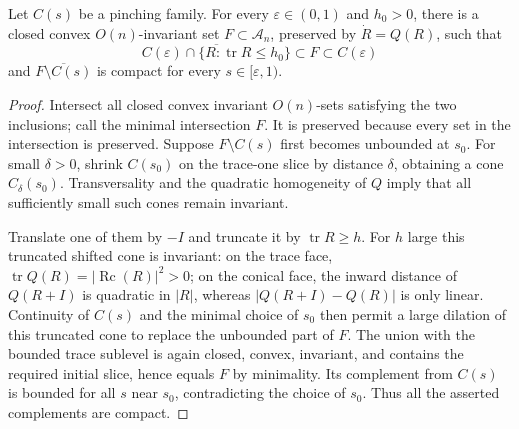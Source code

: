 \begin{theorem}
  \label{thm:chow-ii-generalized-pinching-set}
  Let \(C(s)\) be a pinching family.  For every \(\varepsilon\in(0,1)\) and
  \(h_0>0\), there is a closed convex \(O(n)\)-invariant set
  \(F\subset\mathcal A_n\), preserved by \(\dot R=Q(R)\), such that
  \[
  \overline{C(\varepsilon)\cap\{R:\operatorname{tr}R\le h_0\}}
  \subset F\subset C(\varepsilon)
  \]
  and \(\overline{F\setminus C(s)}\) is compact for every
  \(s\in[\varepsilon,1)\).
\end{theorem}
\begin{proof}
  Intersect all closed convex invariant \(O(n)\)-sets satisfying the two
  inclusions; call the minimal intersection \(F\).  It is preserved because
  every set in the intersection is preserved.  Suppose
  \(F\setminus C(s)\) first becomes unbounded at \(s_0\).  For small
  \(\delta>0\), shrink \(C(s_0)\) on the trace-one slice by distance
  \(\delta\), obtaining a cone \(C_\delta(s_0)\).  Transversality and the
  quadratic homogeneity of \(Q\) imply that all sufficiently small such
  cones remain invariant.

  Translate one of them by \(-I\) and truncate it by
  \(\operatorname{tr}R\ge h\).  For \(h\) large this truncated shifted cone is
  invariant: on the trace face,
  \(\operatorname{tr}Q(R)=|\operatorname{Rc}(R)|^2>0\); on the conical face,
  the inward distance of \(Q(R+I)\) is quadratic in \(|R|\), whereas
  \(|Q(R+I)-Q(R)|\) is only linear.  Continuity of \(C(s)\) and the minimal
  choice of \(s_0\) then permit a large dilation of this truncated cone to
  replace the unbounded part of \(F\).  The union with the bounded trace
  sublevel is again closed, convex, invariant, and contains the required
  initial slice, hence equals \(F\) by minimality.  Its complement from
  \(C(s)\) is bounded for all \(s\) near \(s_0\), contradicting the choice of
  \(s_0\).  Thus all the asserted complements are compact.
\end{proof}

